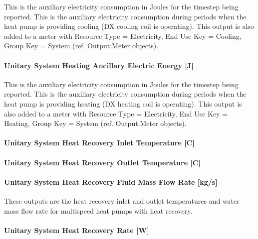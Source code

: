 This is the auxiliary electricity consumption in Joules for the timestep being reported. This is the auxiliary electricity consumption during periods when the heat pump is providing cooling (DX cooling coil is operating). This output is also added to a meter with Resource Type = Electricity, End Use Key = Cooling, Group Key = System (ref. Output:Meter objects).

\paragraph{Unitary System Heating Ancillary Electric Energy {[}J{]}}\label{unitary-system-heating-ancillary-electric-energy-j-1}

This is the auxiliary electricity consumption in Joules for the timestep being reported. This is the auxiliary electricity consumption during periods when the heat pump is providing heating (DX heating coil is operating). This output is also added to a meter with Resource Type = Electricity, End Use Key = Heating, Group Key = System (ref. Output:Meter objects).

\paragraph{Unitary System Heat Recovery Inlet Temperature {[}C{]}}\label{unitary-system-heat-recovery-inlet-temperature-c-1}

\paragraph{Unitary System Heat Recovery Outlet Temperature {[}C{]}}\label{unitary-system-heat-recovery-outlet-temperature-c-1}

\paragraph{Unitary System Heat Recovery Fluid Mass Flow Rate {[}kg/s{]}}\label{unitary-system-heat-recovery-fluid-mass-flow-rate-kgs-1}

These outputs are the heat recovery inlet and outlet temperatures and water mass flow rate for multispeed heat pumps with heat recovery.

\paragraph{Unitary System Heat Recovery Rate {[}W{]}}\label{unitary-system-heat-recovery-rate-w-1}

